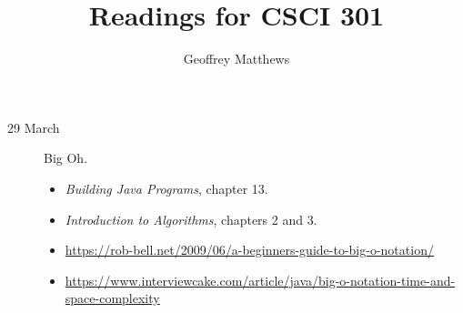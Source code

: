 \documentclass{article}
\title{Readings for CSCI 301}
\author{Geoffrey Matthews}
\begin{document}
\maketitle
\begin{description}
\item[29 March]  Big Oh.
  
  \begin{itemize}
    \item {\em Building Java Programs}, chapter 13.
    \item {\em Introduction to Algorithms}, chapters 2 and 3.
  \item \url{https://rob-bell.net/2009/06/a-beginners-guide-to-big-o-notation/}
    \item \url{https://www.interviewcake.com/article/java/big-o-notation-time-and-space-complexity}
  \end{itemize}
\end{description}
\end{document}

